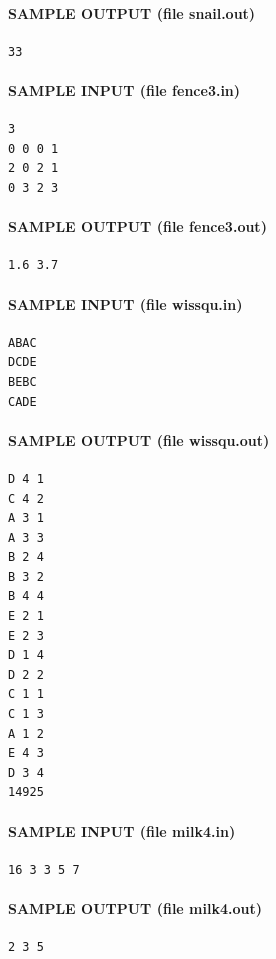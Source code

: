 \documentclass[11pt]{article}
\begin{document}
\paragraph{SAMPLE OUTPUT (file snail.out)}
\begin{verbatim}
33
\end{verbatim}

\paragraph{SAMPLE INPUT (file fence3.in)}
\begin{verbatim}
3
0 0 0 1
2 0 2 1
0 3 2 3
\end{verbatim}

\paragraph{SAMPLE OUTPUT (file fence3.out)}
\begin{verbatim}
1.6 3.7
\end{verbatim}

\paragraph{SAMPLE INPUT (file wissqu.in)}
\begin{verbatim}
ABAC
DCDE
BEBC
CADE
\end{verbatim}

\paragraph{SAMPLE OUTPUT (file wissqu.out)}
\begin{verbatim}
D 4 1
C 4 2
A 3 1
A 3 3
B 2 4
B 3 2
B 4 4
E 2 1
E 2 3
D 1 4
D 2 2
C 1 1
C 1 3
A 1 2
E 4 3
D 3 4
14925
\end{verbatim}

\paragraph{SAMPLE INPUT (file milk4.in)}
\begin{verbatim}
16 3 3 5 7
\end{verbatim}

\paragraph{SAMPLE OUTPUT (file milk4.out)}
\begin{verbatim}
2 3 5
\end{verbatim}
\end{document}
